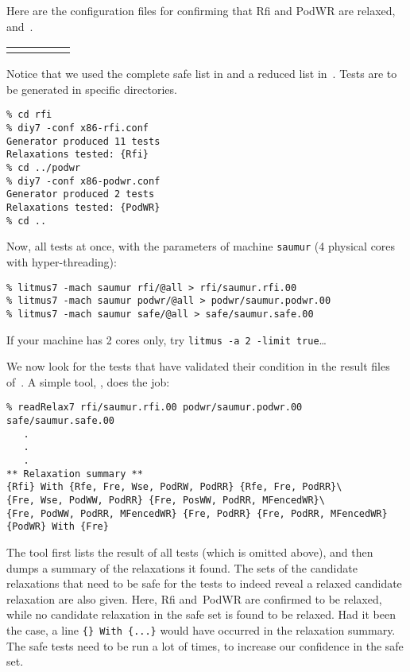 Here are the configuration files for confirming
that Rfi and PodWR are relaxed, 
and~.
\begin{center}\small
\begin{tabular}{p{0.7\linewidth}@{\quad}|@{\quad}p{0.2\linewidth}}
 &

\end{tabular}
\end{center}
Notice that we used the complete safe list in
 and a reduced list in~.
Tests are to be generated in specific directories.
\begin{verbatim}
% cd rfi
% diy7 -conf x86-rfi.conf
Generator produced 11 tests
Relaxations tested: {Rfi}
% cd ../podwr
% diy7 -conf x86-podwr.conf
Generator produced 2 tests
Relaxations tested: {PodWR}
% cd ..
\end{verbatim}

Now,  all tests at once, with the
parameters of machine \texttt{saumur} (4 physical cores with hyper-threading):
\begin{verbatim}
% litmus7 -mach saumur rfi/@all > rfi/saumur.rfi.00
% litmus7 -mach saumur podwr/@all > podwr/saumur.podwr.00
% litmus7 -mach saumur safe/@all > safe/saumur.safe.00
\end{verbatim}
If your machine has 2 cores only, try \verb+litmus -a 2 -limit true+\ldots

\label{readRelax:intro}We now look for
the tests that have validated their condition
in the result files of~\litmus.
A simple tool, \readRelax, does the job:
\begin{verbatim}
% readRelax7 rfi/saumur.rfi.00 podwr/saumur.podwr.00 safe/saumur.safe.00
   .
   .
   .
** Relaxation summary **
{Rfi} With {Rfe, Fre, Wse, PodRW, PodRR} {Rfe, Fre, PodRR}\
{Fre, Wse, PodWW, PodRR} {Fre, PosWW, PodRR, MFencedWR}\
{Fre, PodWW, PodRR, MFencedWR} {Fre, PodRR} {Fre, PodRR, MFencedWR}
{PodWR} With {Fre}
\end{verbatim}
The tool \readRelax{} first lists the result of all tests
(which is omitted above), and then dumps a summary of the
relaxations it found.
The sets of the candidate relaxations  that need to be safe for the tests to
indeed reveal  a relaxed candidate relaxation are also given.
Here, Rfi and~PodWR are confirmed to be relaxed, while no candidate relaxation
in the safe set is found to be relaxed.
Had it been the case, a line \verb+{} With {...}+ would have occurred
in the relaxation summary.
The safe tests need to be run a lot of times, to increase our
confidence in the safe set.

